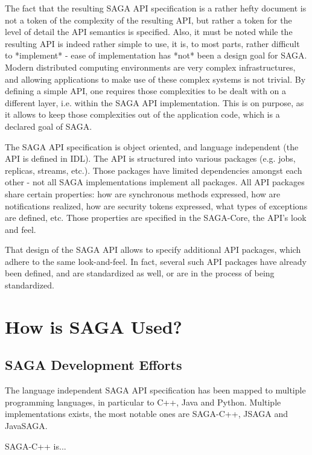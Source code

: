 \documentclass[3p,twocolumn]{article}
\begin{document}
  The fact that the resulting SAGA API specification is a rather hefty
  document is not a token of the complexity of the resulting API, but
  rather a token for the level of detail the API semantics is
  specified.  Also, it must be noted while the resulting API is indeed
  rather simple to use, it is, to most parts, rather difficult to
  *implement* - ease of implementation has *not* been a design goal
  for SAGA.  Modern distributed computing environments are very
  complex infrastructures, and allowing applications to make use of
  these complex systems is not trivial.  By defining a simple API, one
  requires those complexities to be dealt with on a different layer,
  i.e. within the SAGA API implementation. This is on purpose, as it
  allows to keep those complexities out of the application code, which
  is a declared goal of SAGA.

  The SAGA API specification is object oriented, and language
  independent (the API is defined in IDL).  The API is structured into
  various packages (e.g. jobs, replicas, streams, etc.).  Those
  packages have limited dependencies amongst each other - not all SAGA
  implementations implement all packages.  All API packages share
  certain properties: how are synchronous methods expressed, how are
  notifications realized, how are security tokens expressed, what
  types of exceptions are defined, etc.  Those properties are
  specified in the SAGA-Core, the API's look and feel.  

  That design of the SAGA API allows to specify additional API
  packages, which adhere to the same look-and-feel.  In fact, several
  such API packages have already been defined, and are standardized as
  well, or are in the process of being standardized.

\section{How is SAGA Used?}

 \subsection{SAGA Development Efforts}

  The language independent SAGA API specification has been mapped to
  multiple programming languages, in particular to C++, Java and
  Python.  Multiple implementations exists, the  most notable ones are
  SAGA-C++, JSAGA and JavaSAGA.

  SAGA-C++ is...
\end{document}
